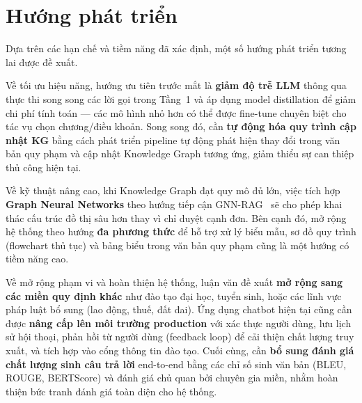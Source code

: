 \section{Hướng phát triển}
\label{sec:huong-phat-trien}

Dựa trên các hạn chế và tiềm năng đã xác định, một số hướng phát triển tương lai được đề xuất.

Về tối ưu hiệu năng, hướng ưu tiên trước mắt là \textbf{giảm độ trễ LLM} thông qua thực thi song song các lời gọi trong Tầng~1 và áp dụng model distillation để giảm chi phí tính toán — các mô hình nhỏ hơn có thể được fine-tune chuyên biệt cho tác vụ chọn chương/điều khoản. Song song đó, cần \textbf{tự động hóa quy trình cập nhật KG} bằng cách phát triển pipeline tự động phát hiện thay đổi trong văn bản quy phạm và cập nhật Knowledge Graph tương ứng, giảm thiểu sự can thiệp thủ công hiện tại.

Về kỹ thuật nâng cao, khi Knowledge Graph đạt quy mô đủ lớn, việc tích hợp \textbf{Graph Neural Networks} theo hướng tiếp cận GNN-RAG~\cite{mavromatis2024gnnrag} sẽ cho phép khai thác cấu trúc đồ thị sâu hơn thay vì chỉ duyệt cạnh đơn. Bên cạnh đó, mở rộng hệ thống theo hướng \textbf{đa phương thức} để hỗ trợ xử lý biểu mẫu, sơ đồ quy trình (flowchart thủ tục) và bảng biểu trong văn bản quy phạm cũng là một hướng có tiềm năng cao.

Về mở rộng phạm vi và hoàn thiện hệ thống, luận văn đề xuất \textbf{mở rộng sang các miền quy định khác} như đào tạo đại học, tuyển sinh, hoặc các lĩnh vực pháp luật bổ sung (lao động, thuế, đất đai). Ứng dụng chatbot hiện tại cũng cần được \textbf{nâng cấp lên môi trường production} với xác thực người dùng, lưu lịch sử hội thoại, phản hồi từ người dùng (feedback loop) để cải thiện chất lượng truy xuất, và tích hợp vào cổng thông tin đào tạo. Cuối cùng, cần \textbf{bổ sung đánh giá chất lượng sinh câu trả lời} end-to-end bằng các chỉ số sinh văn bản (BLEU, ROUGE, BERTScore) và đánh giá chủ quan bởi chuyên gia miền, nhằm hoàn thiện bức tranh đánh giá toàn diện cho hệ thống.
